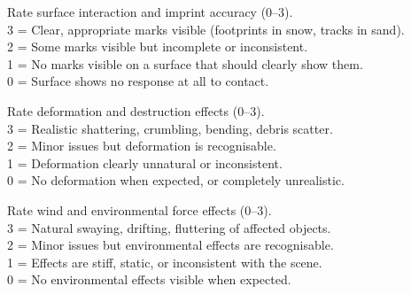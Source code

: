 \vspace{4pt}

\begin{tcolorbox}[d5box, title={Track 2 Rubric --- Surface Tracks \& Imprints}]
\ttfamily\scriptsize
Rate surface interaction and imprint accuracy (0--3).\\
3 = Clear, appropriate marks visible (footprints in snow, tracks in sand).\\
2 = Some marks visible but incomplete or inconsistent.\\
1 = No marks visible on a surface that should clearly show them.\\
0 = Surface shows no response at all to contact.
\end{tcolorbox}

\vspace{4pt}

\begin{tcolorbox}[d5box, title={Track 2 Rubric --- Deformation \& Destruction}]
\ttfamily\scriptsize
Rate deformation and destruction effects (0--3).\\
3 = Realistic shattering, crumbling, bending, debris scatter.\\
2 = Minor issues but deformation is recognisable.\\
1 = Deformation clearly unnatural or inconsistent.\\
0 = No deformation when expected, or completely unrealistic.
\end{tcolorbox}

\vspace{4pt}

\begin{tcolorbox}[d5box, title={Track 2 Rubric --- Wind \& Environmental Forces}]
\ttfamily\scriptsize
Rate wind and environmental force effects (0--3).\\
3 = Natural swaying, drifting, fluttering of affected objects.\\
2 = Minor issues but environmental effects are recognisable.\\
1 = Effects are stiff, static, or inconsistent with the scene.\\
0 = No environmental effects visible when expected.
\end{tcolorbox}

\vspace{4pt}

